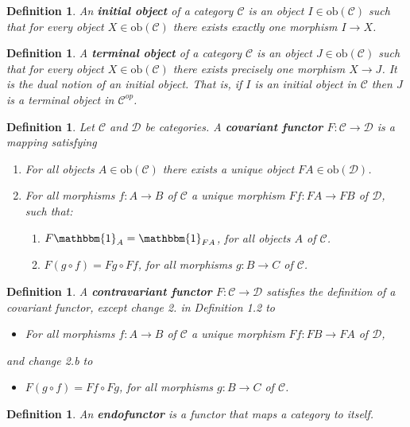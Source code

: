 \documentclass[11pt]{report}
\newcommand{\mcC}{\mathcal{C}}
\newcommand{\mcD}{\mathcal{D}}
\newcommand{\ob}{\text{ob}}
\newtheorem{defn}[thm]{Definition} %
\begin{document}
\begin{defn}
  An \textbf{initial object} of a category $\mcC$ is an object $I \in \ob(\mcC)$ such that for every object $X \in \ob(\mcC)$ there exists exactly one morphism $I \to X$.
\end{defn}

\begin{defn}
  A \textbf{terminal object} of a category $\mcC$ is an object $J \in \ob(\mcC)$ such that for every object $X \in \ob(\mcC)$ there exists precisely one morphism $X \to J$.
  It is the dual notion of an initial object. That is, if $I$ is an initial object in $\mcC$ then $J$ is a terminal object in $\mcC^{op}$.
\end{defn}

\begin{defn}
  Let $\mcC$ and $\mcD$ be categories. A \textbf{covariant functor } $F: \mcC \to \mcD$ is a mapping satisfying
  \begin{enumerate}
  \item For all objects $A \in \ob(\mcC)$ there exists a unique object $FA \in \ob(\mcD)$.
  \item For all morphisms $f:A \to B$ of $\mcC$ a unique morphism $Ff:FA \to FB$ of $\mcD$, such that:
    \begin{enumerate}
    \item $F\mathbbm{1}_A = \mathbbm{1}_{FA}$, for all objects $A$ of $\mcC$. \\
    \item $F(g \circ f) = Fg \circ Ff$, for all morphisms $g: B \to C$ of $\mcC$.
    \end{enumerate}
  \end{enumerate}
\end{defn}
\begin{defn}
  A \textbf{contravariant functor} $F: \mcC \to \mcD$ satisfies the definition of a covariant functor, except change 2. in Definition 1.2 to
  \begin{itemize}
    \item For all morphisms $f:A \to B$ of $\mcC$ a unique morphism $Ff:FB \to FA$ of $\mcD$,
  \end{itemize}
  and change 2.b to
  \begin{itemize}
    \item $F(g \circ f) = Ff \circ Fg$, for all morphisms $g: B \to C$ of $\mcC$.
  \end{itemize}
\end{defn}

\begin{defn}
  An \textbf{endofunctor} is a functor that maps a category to itself. 
\end{defn}
\end{document}
